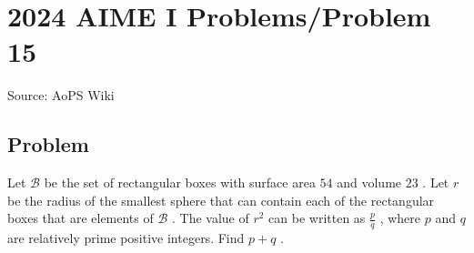 \documentclass[12pt]{article}
\begin{document}
\section*{{2024 AIME I Problems/Problem 15}}
Source: AoPS Wiki

\subsection*{Problem}
Let $\mathcal{B}$ be the set of rectangular boxes with surface area $54$ and volume $23$ . Let $r$ be the radius of the smallest sphere that can contain each of the rectangular boxes that are elements of $\mathcal{B}$ . The value of $r^2$ can be written as $\frac{p}{q}$ , where $p$ and $q$ are relatively prime positive integers. Find $p+q$ .
\end{document}
